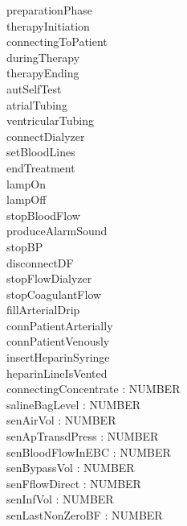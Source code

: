 
\begin{zed}
\end{zed}

\begin{circus}
\circchannel preparationPhase\\
\circchannel therapyInitiation\\
\circchannel connectingToPatient\\
\circchannel duringTherapy\\
\circchannel therapyEnding\\
\circchannel autSelfTest\\
\circchannel atrialTubing\\
\circchannel ventricularTubing\\
\circchannel connectDialyzer\\
\circchannel setBloodLines\\
\circchannel endTreatment\\
\circchannel lampOn\\
\circchannel lampOff\\
\circchannel stopBloodFlow\\
\circchannel produceAlarmSound\\
\circchannel stopBP\\
\circchannel disconnectDF\\
\circchannel stopFlowDialyzer\\
\circchannel stopCoagulantFlow\\
\circchannel fillArterialDrip\\
\circchannel connPatientArterially\\
\circchannel connPatientVenously\\
\circchannel insertHeparinSyringe\\
\circchannel heparinLineIsVented\\
\circchannel connectingConcentrate : NUMBER\\
\circchannel salineBagLevel : NUMBER\\
\circchannel senAirVol : NUMBER\\
\circchannel senApTransdPress : NUMBER\\
\circchannel senBloodFlowInEBC : NUMBER\\
\circchannel senBypassVol : NUMBER\\
\circchannel senFflowDirect : NUMBER\\
\circchannel senInfVol : NUMBER\\
\circchannel senLastNonZeroBF : NUMBER\\

\end{circus}
